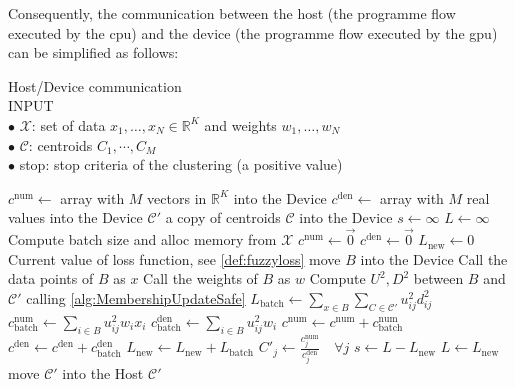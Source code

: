 \begin{toReview}
	\noindent Consequently, the communication between the host (the programme flow executed by the \gls{cpu}) and the device (the programme flow executed by the \gls{gpu}) can be simplified as follows:

	\begin{algorithm}[H]
		\caption{Host/Device communication\\
			\textsc{INPUT}\\
			$\bullet$ $\mathcal{X}$: set of data $x_1,\ldots,x_N\in\mathbb{R}^K$ and weights $w_1,\ldots,w_N$\\
			$\bullet$ $\mathcal{C}$: centroids $C_1,\cdots,C_M$\\
			$\bullet$ stop: stop criteria of the clustering (a positive value)
		}
		\begin{algorithmic}[1]
				\State $c^\text{num} \gets $ array with $M$ vectors in $\mathbb{R}^K$ into the Device
				\State $c^\text{den} \gets $ array with $M$ real values into the Device
				\State $\mathcal{C}'$ a copy of centroids $\mathcal{C}$ into the Device
				\State $s \gets \infty$
				\State $L \gets \infty$
					\State Compute batch size and alloc memory from $\mathcal{X}$
					\State $c^\text{num}\gets \vec{0}$
					\State $c^\text{den}\gets \vec{0}$
					\State $L_\text{new} \gets 0$ \Comment Current value of loss function, see \cref{def:fuzzyloss}
						\State move $B$ into the Device
						\State Call the data points of $B$ as $x$
						\State Call the weights of $B$ as $w$
						\State Compute $U^2, D^2$ between $B$ and $\mathcal{C}'$ \Comment calling \cref{alg:MembershipUpdateSafe}
						\State $L_\text{batch} \gets \sum_{x\in B}\sum_{C\in\mathcal{C'}}u_{ij}^2d_{ij}^2$
						\State $c^\text{num}_\text{batch} \gets \sum_{i\in B} u_{ij}^2w_ix_i$
						\State $c^\text{den}_\text{batch} \gets \sum_{i\in B} u_{ij}^2w_i$
						\State $c^\text{num} \gets c^\text{num} + c^\text{num}_\text{batch}$
						\State $c^\text{den} \gets c^\text{den} + c^\text{den}_\text{batch}$
						\State $L_\text{new} \gets L_\text{new} + L_\text{batch}$
					\EndFor
					\State $C'_j \gets \frac{c^\text{num}_j}{ c^\text{den}_j} \quad \forall j$
					\State $s \gets L - L_\text{new}$
					\State $L \gets L_\text{new}$
				\EndWhile
				\State move $\mathcal{C}'$ into the Host
				\State \Return $\mathcal{C}'$
			\EndFunction
			\label{alg:FCMwrapper}
		\end{algorithmic}
	\end{algorithm}


\end{toReview}
